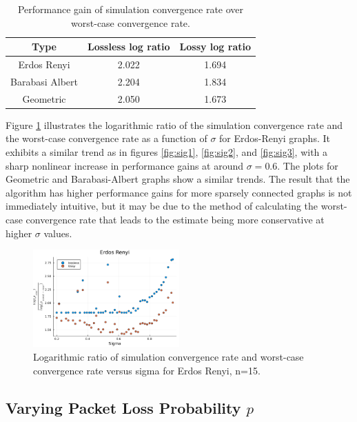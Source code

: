 \documentclass[conference]{IEEEtran}
\begin{document}
\begin{table}[h]
    \centering
    \begin{tabular}{c c c}
    \hline
    Type & Lossless log ratio & Lossy log ratio \\
    \hline
    \hline
    Erdos Renyi & 2.022 & 1.694 \\
    Barabasi Albert & 2.204 & 1.834 \\
    Geometric & 2.050 & 1.673 \\
    \end{tabular}
    \caption{Performance gain of simulation convergence rate over worst-case convergence rate.}
    \label{tab:log_ratios}
\end{table}

Figure \ref{fig:sig4} illustrates the logarithmic ratio of the simulation convergence rate and the worst-case convergence rate as a function of $\sigma$ for Erdos-Renyi graphs. 
It exhibits a similar trend as in figures \ref{fig:sig1}, \ref{fig:sig2}, and \ref{fig:sig3}, with a sharp nonlinear increase in performance gains at around $\sigma = 0.6$. 
The plots for Geometric and Barabasi-Albert graphs show a similar trends. The result that the algorithm has higher performance gains for more 
sparsely connected graphs is not immediately intuitive, but it may be due to the method of calculating the worst-case convergence rate that leads to the estimate being more conservative
at higher $\sigma$ values.

\begin {figure}[h]
    \centering
    \includegraphics[width=0.5\textwidth]{s-er-ratio.png}
    \caption{Logarithmic ratio of simulation convergence rate and worst-case convergence rate versus sigma for Erdos Renyi, n=15.}
    \label{fig:sig4}
\end{figure}

\subsection{Varying Packet Loss Probability $p$}
\end{document}
